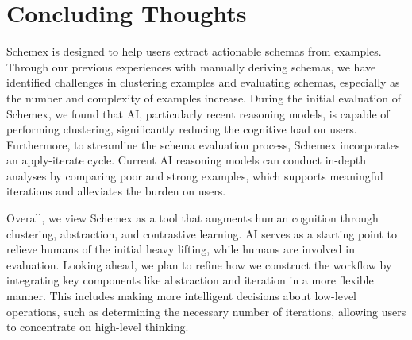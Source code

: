 \section{Concluding Thoughts}

Schemex is designed to help users extract actionable schemas from examples. 
Through our previous experiences with manually deriving schemas, we have identified challenges in clustering examples and evaluating schemas, especially as the number and complexity of examples increase. 
During the initial evaluation of Schemex, we found that AI, particularly recent reasoning models, is capable of performing clustering, significantly reducing the cognitive load on users. 
Furthermore, to streamline the schema evaluation process, Schemex incorporates an apply-iterate cycle. 
Current AI reasoning models can conduct in-depth analyses by comparing poor and strong examples, which supports meaningful iterations and alleviates the burden on users.

Overall, we view Schemex as a tool that augments human cognition through clustering, abstraction, and contrastive learning. 
AI serves as a starting point to relieve humans of the initial heavy lifting, while humans are involved in evaluation. 
Looking ahead, we plan to refine how we construct the workflow by integrating key components like abstraction and iteration in a more flexible manner. 
This includes making more intelligent decisions about low-level operations, such as determining the necessary number of iterations, allowing users to concentrate on high-level thinking.